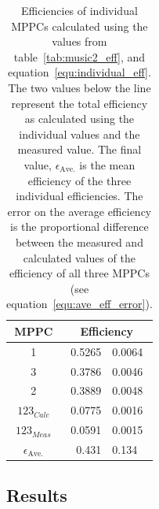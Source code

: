 \begin{table}
  \lineup
  \begin{center}
    \begin{tabular}{c|r@{~\(\pm\)~}l}
      MPPC  &  \multicolumn{2}{c}{Efficiency} \\
      \hline
      1  &  0.5265 & 0.0064  \\
      3  &  0.3786 & 0.0046  \\
      2  &  0.3889 & 0.0048  \\
      \hline
      \( 123_{Calc} \)  &  0.0775  &  0.0016  \\
      \( 123_{Meas} \)  &  0.0591  &  0.0015  \\
      \hline 
      \( \epsilon_{\text{Ave.}} \)  &  0.431\0 & 0.134 \\
         
    \end{tabular}
  \end{center}
  \caption{Efficiencies of individual MPPCs calculated using the values from table~\ref{tab:music2_eff}, and equation~\eqref{equ:individual_eff}. The two values below the line represent the total efficiency as calculated using the individual values and the measured value. The final value, \(\epsilon_{\text{Ave.}}\) is the mean efficiency of the three individual efficiencies. The error on the average efficiency is the proportional difference between the measured and calculated values of the efficiency of all three MPPCs (see equation~\eqref{equ:ave_eff_error}).}
  \label{tab:calculated_individual_eff}
\end{table}


\subsection{Results} %
\label{sec:results}

